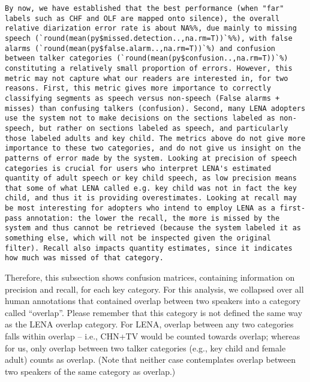 \documentclass[english,floatsintext,man]{apa6}
\begin{document}
\begin{verbatim}
By now, we have established that the best performance (when "far" labels such as CHF and OLF are mapped onto silence), the overall relative diarization error rate is about NA%%, due mainly to missing speech (`round(mean(py$missed.detection..,na.rm=T))`%%), with false alarms (`round(mean(py$false.alarm..,na.rm=T))`%) and confusion between talker categories (`round(mean(py$confusion..,na.rm=T))`%) constituting a relatively small proportion of errors. However, this metric may not capture what our readers are interested in, for two reasons. First, this metric gives more importance to correctly classifying segments as speech versus non-speech (False alarms + misses) than confusing talkers (confusion). Second, many LENA adopters use the system not to make decisions on the sections labeled as non-speech, but rather on sections labeled as speech, and particularly those labeled adults and key child. The metrics above do not give more importance to these two categories, and do not give us insight on the patterns of error made by the system. Looking at precision of speech categories is crucial for users who interpret LENA's estimated quantity of adult speech or key child speech, as low precision means that some of what LENA called e.g. key child was not in fact the key child, and thus it is providing overestimates. Looking at recall may be most interesting for adopters who intend to employ LENA as a first-pass annotation: the lower the recall, the more is missed by the system and thus cannot be retrieved (because the system labeled it as something else, which will not be inspected given the original filter). Recall also impacts quantity estimates, since it indicates how much was missed of that category.
\end{verbatim}

Therefore, this subsection shows confusion matrices, containing
information on precision and recall, for each key category. For this
analysis, we collapsed over all human annotations that contained overlap
between two speakers into a category called \enquote{overlap}. Please
remember that this category is not defined the same way as the LENA
overlap category. For LENA, overlap between any two categories falls
within overlap -- i.e., CHN+TV would be counted towards overlap; whereas
for us, only overlap between two talker categories (e.g., key child and
female adult) counts as overlap. (Note that neither case contemplates
overlap between two speakers of the same category as overlap.)
\end{document}
